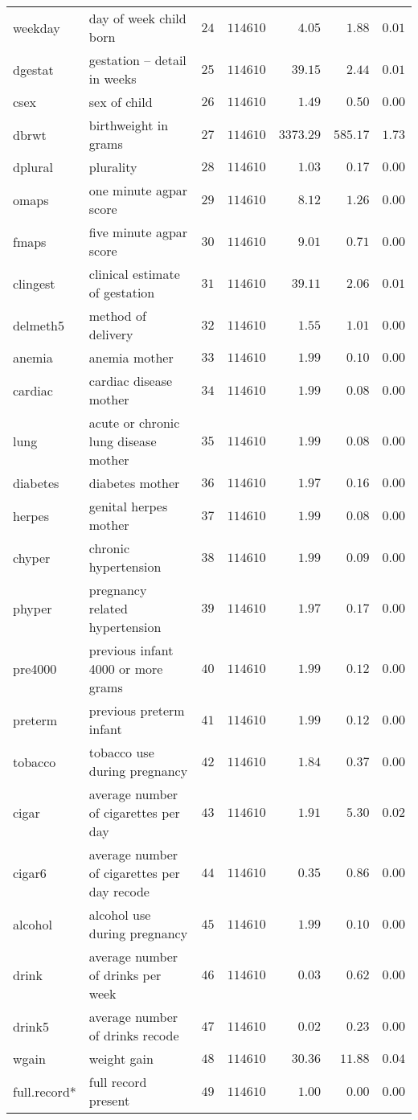 \begin{table}[!tbp]
\begin{center}
\begin{tabular}{|l|l|r|r|r|r|r|}
weekday&day of week child born&$24$&$114610$&$   4.05$&$  1.88$&$0.01$\tabularnewline
dgestat&gestation -- detail in weeks&$25$&$114610$&$  39.15$&$  2.44$&$0.01$\tabularnewline
csex&sex of child&$26$&$114610$&$   1.49$&$  0.50$&$0.00$\tabularnewline
dbrwt&birthweight in grams&$27$&$114610$&$3373.29$&$585.17$&$1.73$\tabularnewline
dplural&plurality&$28$&$114610$&$   1.03$&$  0.17$&$0.00$\tabularnewline
omaps&one minute agpar score&$29$&$114610$&$   8.12$&$  1.26$&$0.00$\tabularnewline
fmaps&five minute agpar score&$30$&$114610$&$   9.01$&$  0.71$&$0.00$\tabularnewline
clingest&clinical estimate of gestation&$31$&$114610$&$  39.11$&$  2.06$&$0.01$\tabularnewline
delmeth5&method of delivery&$32$&$114610$&$   1.55$&$  1.01$&$0.00$\tabularnewline
anemia&anemia mother&$33$&$114610$&$   1.99$&$  0.10$&$0.00$\tabularnewline
cardiac&cardiac disease mother&$34$&$114610$&$   1.99$&$  0.08$&$0.00$\tabularnewline
lung&acute or chronic lung disease mother&$35$&$114610$&$   1.99$&$  0.08$&$0.00$\tabularnewline
diabetes&diabetes mother&$36$&$114610$&$   1.97$&$  0.16$&$0.00$\tabularnewline
herpes&genital herpes mother&$37$&$114610$&$   1.99$&$  0.08$&$0.00$\tabularnewline
chyper&chronic hypertension&$38$&$114610$&$   1.99$&$  0.09$&$0.00$\tabularnewline
phyper&pregnancy related hypertension&$39$&$114610$&$   1.97$&$  0.17$&$0.00$\tabularnewline
pre4000&previous infant 4000 or more grams&$40$&$114610$&$   1.99$&$  0.12$&$0.00$\tabularnewline
preterm&previous preterm infant&$41$&$114610$&$   1.99$&$  0.12$&$0.00$\tabularnewline
tobacco&tobacco use during pregnancy&$42$&$114610$&$   1.84$&$  0.37$&$0.00$\tabularnewline
cigar&average number of cigarettes per day&$43$&$114610$&$   1.91$&$  5.30$&$0.02$\tabularnewline
cigar6&average number of cigarettes per day recode&$44$&$114610$&$   0.35$&$  0.86$&$0.00$\tabularnewline
alcohol&alcohol use during pregnancy&$45$&$114610$&$   1.99$&$  0.10$&$0.00$\tabularnewline
drink&average number of drinks per week&$46$&$114610$&$   0.03$&$  0.62$&$0.00$\tabularnewline
drink5&average number of drinks recode&$47$&$114610$&$   0.02$&$  0.23$&$0.00$\tabularnewline
wgain&weight gain&$48$&$114610$&$  30.36$&$ 11.88$&$0.04$\tabularnewline
full.record*&full record present&$49$&$114610$&$   1.00$&$  0.00$&$0.00$\tabularnewline
\hline
\end{tabular}
\end{center}
\end{table}

